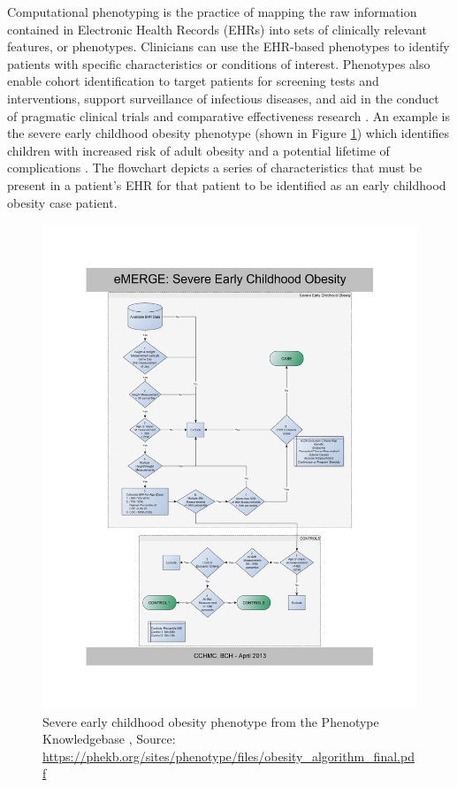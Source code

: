 \documentclass{sig-alternate-05-2015}
\begin{document}
Computational phenotyping is the practice of mapping the raw information contained in Electronic Health Records (EHRs) into sets of clinically relevant features, or phenotypes.
Clinicians can use the EHR-based phenotypes to identify patients with specific characteristics or conditions of interest.
Phenotypes also enable cohort identification to target patients for screening tests and interventions, support surveillance of infectious diseases, and aid in the conduct of pragmatic clinical trials and comparative effectiveness research \cite{Collaboratory:MR-x2zyZ}.
An example is the severe early childhood obesity phenotype (shown in Figure \ref{fig:obesity-pheno}) which identifies children with increased risk of adult obesity and a potential lifetime of complications \cite{phekb:obesity}.
The flowchart depicts a series of characteristics that must be present in a patient's EHR for that patient to be identified as an early childhood obesity case patient.

\begin{figure} [t]
\centering
\includegraphics[width=\linewidth]{obesity_algorithm_final.pdf}
\caption{Severe early childhood obesity phenotype from the Phenotype Knowledgebase \cite{phekb:obesity}, Source: \protect\url{https://phekb.org/sites/phenotype/files/obesity_algorithm_final.pdf}}
\label{fig:obesity-pheno}
\end{figure}
\end{document}
